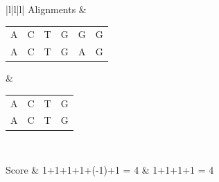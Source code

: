 \documentclass{article}
\begin{document}
\begin{enumerate}
		\begin{table}[hbt!]
			\centering
			
			\begin{tabular}{|l|l|l|}
				\hline
				Alignments &  
				\begin{tabular}{cccccc} 
					A & C & T & G & G & G \\  
					A & C & T & G & A & G
				\end{tabular}  & 
				
				\begin{tabular}{cccc} 
					A & C & T & G \\  
					A & C & T & G 
				\end{tabular}  \\ \hline
				
				Score      & 1+1+1+1+(-1)+1 = 4 & 1+1+1+1 = 4  \\ \hline
				
			\end{tabular}
		\end{table}
		
	

	\end{enumerate}
	
	
\end{document}

